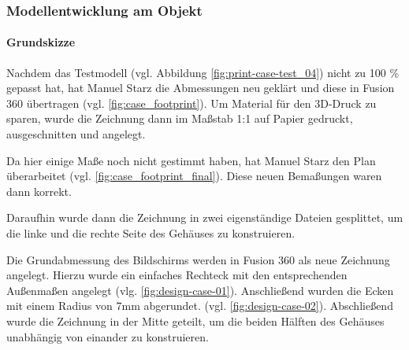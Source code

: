 \subsubsection{Modellentwicklung am Objekt}\label{hw_case_modellentwicklung}
\paragraph{Grundskizze}
Nachdem das Testmodell (vgl. Abbildung \ref{fig:print-case-test_04}) nicht zu 100 \% gepasst hat, hat Manuel Starz die Abmessungen neu geklärt und diese in Fusion 360 übertragen (vgl. \ref{fig:case_footprint}). Um Material für den 3D-Druck zu sparen, wurde die Zeichnung dann im Maßstab 1:1 auf Papier gedruckt, ausgeschnitten und angelegt.\par
Da hier einige Maße noch nicht gestimmt haben, hat Manuel Starz den Plan überarbeitet (vgl. \ref{fig:case_footprint_final}). Diese neuen Bemaßungen waren dann korrekt.\par
Daraufhin wurde dann die Zeichnung in zwei eigenständige Dateien gesplittet, um die linke und die rechte Seite des Gehäuses zu konstruieren.\par
Die Grundabmessung des Bildschirms werden in Fusion 360 als neue Zeichnung angelegt. Hierzu wurde ein einfaches Rechteck mit den entsprechenden Außenmaßen angelegt (vlg. \ref{fig:design-case-01}). Anschließend wurden die Ecken mit einem Radius von 7mm abgerundet. (vgl. \ref{fig:design-case-02}). Abschließend wurde die Zeichnung in der Mitte geteilt, um die beiden Hälften des Gehäuses unabhängig von einander zu konstruieren.\par

